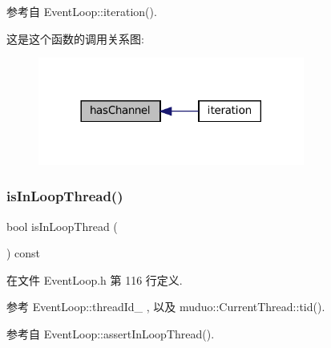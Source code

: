参考自 Event\+Loop\+::iteration().

这是这个函数的调用关系图\+:
\nopagebreak
\begin{figure}[H]
\begin{center}
\leavevmode
\includegraphics[width=248pt]{classmuduo_1_1net_1_1EventLoop_a0647c81270e2be2510f0a97dde87e7a1_icgraph}
\end{center}
\end{figure}
\mbox{\label{classmuduo_1_1net_1_1EventLoop_a1da5ae1e094c0136136b5344ef7a3b66}} 
\subsubsection{\texorpdfstring{is\+In\+Loop\+Thread()}{isInLoopThread()}}
{\footnotesize\ttfamily bool is\+In\+Loop\+Thread (\begin{DoxyParamCaption}{ }\end{DoxyParamCaption}) const\hspace{0.3cm}{\ttfamily [inline]}}



在文件 Event\+Loop.\+h 第 116 行定义.



参考 Event\+Loop\+::thread\+Id\+\_\+ , 以及 muduo\+::\+Current\+Thread\+::tid().



参考自 Event\+Loop\+::assert\+In\+Loop\+Thread().

